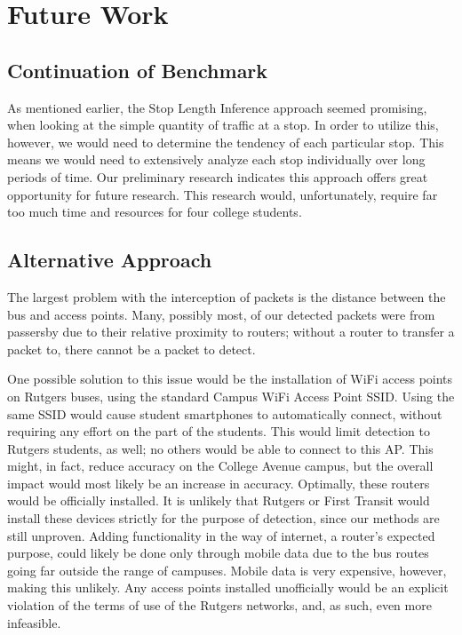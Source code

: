 \section{Future Work}



\subsection{Continuation of Benchmark}
As mentioned earlier, the Stop Length Inference approach seemed promising, when looking at the simple quantity of traffic at a stop.
In order to utilize this, however, we would need to determine the tendency of each particular stop.
This means we would need to extensively analyze each stop individually over long periods of time.
Our preliminary research indicates this approach offers great opportunity for future research.
This research would, unfortunately, require far too much time and resources for four college students.

\subsection{Alternative Approach}
The largest problem with the interception of packets is the distance between the bus and access points.
Many, possibly most, of our detected packets were from passersby due to their relative proximity to routers; without a router to transfer a packet to, there cannot be a packet to detect.

One possible solution to this issue would be the installation of WiFi access points on Rutgers buses, using the standard Campus WiFi Access Point SSID.
Using the same SSID would cause student smartphones to automatically connect, without requiring any effort on the part of the students.
This would limit detection to Rutgers students, as well; no others would be able to connect to this AP.
This might, in fact, reduce accuracy on the College Avenue campus, but the overall impact would most likely be an increase in accuracy.
Optimally, these routers would be officially installed.
It is unlikely that Rutgers or First Transit would install these devices strictly for the purpose of detection, since our methods are still unproven.
Adding functionality in the way of internet, a router's expected purpose, could likely be done only through mobile data due to the bus routes going far outside the range of campuses.
Mobile data is very expensive, however, making this unlikely.
Any access points installed unofficially would be an explicit violation of the terms of use of the Rutgers networks, and, as such, even more infeasible.

